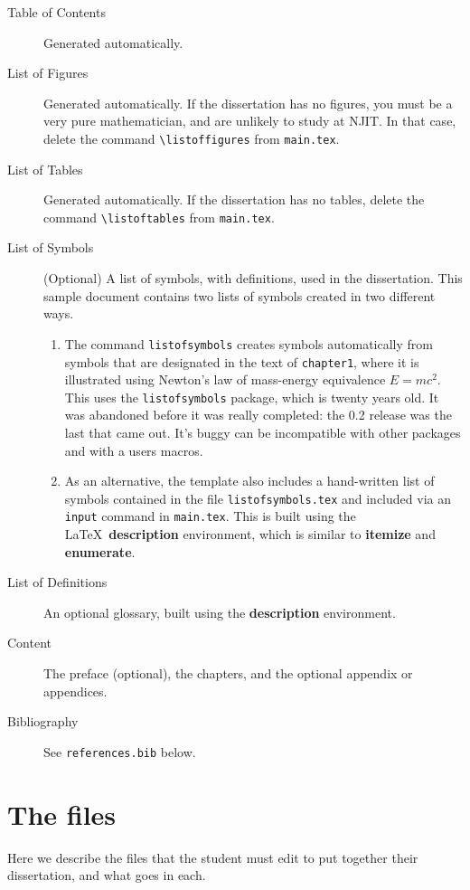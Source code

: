 \begin{description}
%
\item [Table of Contents] Generated automatically.
%
\item [List of Figures] Generated automatically. If the dissertation has no figures, you must be a very pure mathematician, and are unlikely to study at NJIT. In that case, delete the command \verb+\listoffigures+ from \texttt{main.tex}.
\item [List of Tables] Generated automatically. If the dissertation has no tables, delete the command \verb+\listoftables+ from \texttt{main.tex}.
%
\item [List of Symbols] (Optional) A list of symbols, with definitions, used in the dissertation. This sample document contains two lists of symbols created in two different ways. 
\begin{enumerate}
\item The command \texttt{listofsymbols} creates symbols automatically from symbols that are designated in the text of \texttt{chapter1}, where it is illustrated using Newton's law of mass-energy equivalence $E=m c^2$. This uses the \texttt{listofsymbols} package, which is twenty years old. It was abandoned before it was really completed: the 0.2 release was the last that came out. It's buggy can be incompatible with other packages and with a users macros.
\item As an alternative, the template also includes a hand-written list of symbols contained in the file \texttt{listofsymbols.tex} and included via an \texttt{input} command in \texttt{main.tex}. This is built using the \LaTeX\ \textbf{description} environment, which is similar to \textbf{itemize} and \textbf{enumerate}.
\end{enumerate}
%
\item [List of Definitions] An optional glossary, built using the \textbf{description} environment.
%
\item [Content] The preface (optional), the chapters, and the optional appendix or appendices.
%
\item [Bibliography] See \texttt{references.bib} below.
\end{description}


\section*{The files}

Here we describe the files that the student must edit to put together their dissertation, and what goes in each.

